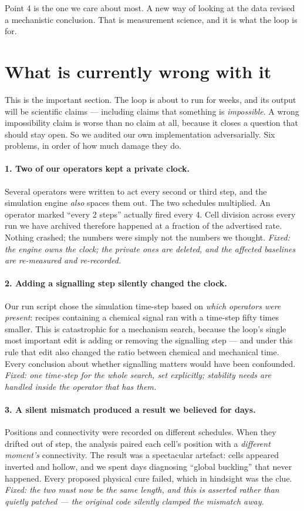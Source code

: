 \documentclass[11pt]{article}
\begin{document}
Point 4 is the one we care about most. A new way of looking at the data revised a mechanistic
conclusion. That is measurement science, and it is what the loop is for.

\section{What is currently wrong with it}
\label{sec:wrong}

This is the important section. The loop is about to run for weeks, and its output will be
scientific claims --- including claims that something is \emph{impossible}. A wrong impossibility
claim is worse than no claim at all, because it closes a question that should stay open. So we
audited our own implementation adversarially. Six problems, in order of how much damage they do.

\paragraph{1. Two of our operators kept a private clock.}
Several operators were written to act every second or third step, and the simulation engine
\emph{also} spaces them out. The two schedules multiplied. An operator marked ``every 2 steps''
actually fired every 4. Cell division across every run we have archived therefore happened at a
fraction of the advertised rate. Nothing crashed; the numbers were simply not the numbers we
thought. \emph{Fixed: the engine owns the clock; the private ones are deleted, and the affected
baselines are re-measured and re-recorded.}

\paragraph{2. Adding a signalling step silently changed the clock.}
Our run script chose the simulation time-step based on \emph{which operators were present}:
recipes containing a chemical signal ran with a time-step fifty times smaller. This is
catastrophic for a mechanism search, because the loop's single most important edit is adding or
removing the signalling step --- and under this rule that edit also changed the ratio between
chemical and mechanical time. Every conclusion about whether signalling matters would have been
confounded. \emph{Fixed: one time-step for the whole search, set explicitly; stability needs are
handled inside the operator that has them.}

\paragraph{3. A silent mismatch produced a result we believed for days.}
Positions and connectivity were recorded on different schedules. When they drifted out of step,
the analysis paired each cell's position with a \emph{different moment's} connectivity. The
result was a spectacular artefact: cells appeared inverted and hollow, and we spent days
diagnosing ``global buckling'' that never happened. Every proposed physical cure failed, which
in hindsight was the clue. \emph{Fixed: the two must now be the same length, and this is asserted
rather than quietly patched --- the original code silently clamped the mismatch away.}
\end{document}
